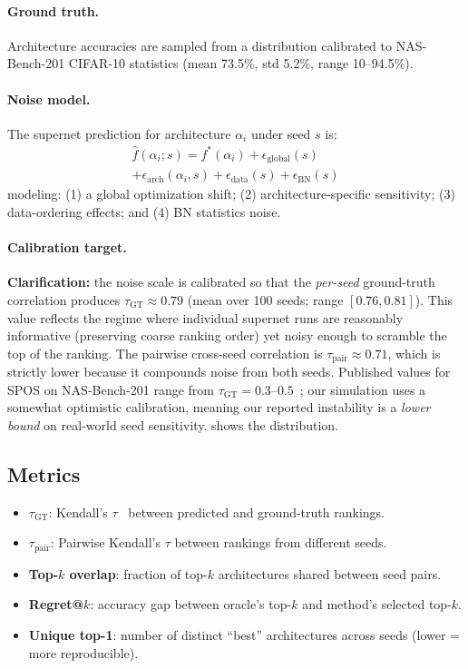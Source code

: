 \documentclass[10pt,twocolumn,letterpaper]{article}
\newcommand{\taugt}{\ensuremath{\tau_{\text{GT}}}}
\newcommand{\taupair}{\ensuremath{\tau_{\text{pair}}}}
\begin{document}
\paragraph{Ground truth.} Architecture accuracies are sampled from a distribution calibrated to NAS-Bench-201 CIFAR-10 statistics (mean 73.5\%, std 5.2\%, range 10--94.5\%).

\paragraph{Noise model.} The supernet prediction for architecture $\alpha_i$ under seed $s$ is:
\begin{multline}
    \hat{f}(\alpha_i; s) = f^*(\alpha_i) + \epsilon_{\text{global}}(s) \\
    + \epsilon_{\text{arch}}(\alpha_i, s) + \epsilon_{\text{data}}(s) + \epsilon_{\text{BN}}(s)
\end{multline}
modeling: (1) a global optimization shift; (2) architecture-specific sensitivity; (3) data-ordering effects; and (4) BN statistics noise.

\paragraph{Calibration target.}
\textbf{Clarification:} the noise scale is calibrated so that the \textit{per-seed} ground-truth correlation produces $\taugt \approx 0.79$ (mean over 100 seeds; range $[0.76, 0.81]$). This value reflects the regime where individual supernet runs are reasonably informative (preserving coarse ranking order) yet noisy enough to scramble the top of the ranking. The pairwise cross-seed correlation is $\taupair \approx 0.71$, which is strictly lower because it compounds noise from both seeds. Published values for SPOS on NAS-Bench-201 range from $\taugt = 0.3$--$0.5$~\cite{yu2020evaluating}; our simulation uses a somewhat optimistic calibration, meaning our reported instability is a \textit{lower bound} on real-world seed sensitivity.  shows the distribution.

\subsection{Metrics}
\begin{itemize}
    \item $\taugt$: Kendall's $\tau$~\cite{kendall1938} between predicted and ground-truth rankings.
    \item $\taupair$: Pairwise Kendall's $\tau$ between rankings from different seeds.
    \item \textbf{Top-$k$ overlap}: fraction of top-$k$ architectures shared between seed pairs.
    \item \textbf{Regret@$k$}: accuracy gap between oracle's top-$k$ and method's selected top-$k$.
    \item \textbf{Unique top-1}: number of distinct ``best'' architectures across seeds (lower = more reproducible).
\end{itemize}
\end{document}
